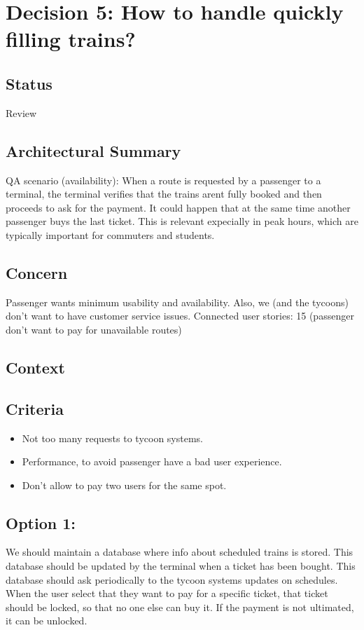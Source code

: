 \section*{Decision 5: How to handle quickly filling trains?}

\subsection*{Status}
Review

\subsection*{Architectural Summary}
QA scenario (availability): When a route is requested by a passenger to a terminal, the terminal verifies that the trains arent fully booked and then proceeds to
ask for the payment.
It could happen that at the same time another passenger buys the last ticket. This is relevant expecially in peak hours, which are typically important for commuters and students.

\subsection*{Concern}
Passenger wants minimum usability and availability. Also, we (and the tycoons) don't want to have customer service issues.
Connected user stories: 15 (passenger don't want to pay for unavailable routes)

\subsection*{Context}


\subsection*{Criteria}
\begin{itemize}
\item Not too many requests to tycoon systems.
\item Performance, to avoid passenger have a bad user experience.
\item Don't allow to pay two users for the same spot.
\end{itemize}

\subsection*{Option 1: }
We should maintain a database where info about scheduled trains is stored. 
This database should be updated by the terminal when a ticket has been bought.
This database should ask periodically to the tycoon systems updates on schedules.
When the user select that they want to pay for a specific ticket, that ticket should be locked, so that no one else can buy it. 
If the payment is not ultimated, it can be unlocked.

